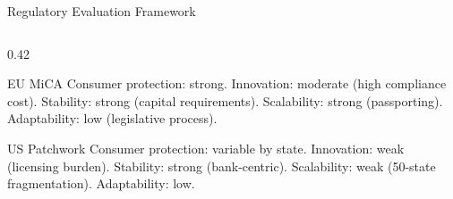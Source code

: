\begin{frame}{Regulatory Evaluation Framework}
\begin{columns}[T]
\begin{column}{0.42\textwidth}
      \vspace{0.3em}
      \begin{block}{EU MiCA}
        Consumer protection: strong. Innovation: moderate (high compliance
        cost). Stability: strong (capital requirements). Scalability:
        strong (passporting). Adaptability: low (legislative process).
      \end{block}

      \vspace{0.3em}
      \begin{block}{US Patchwork}
        Consumer protection: variable by state. Innovation: weak (licensing
        burden). Stability: strong (bank-centric). Scalability: weak
        (50-state fragmentation). Adaptability: low.
      \end{block}
    \end{column}
  \end{columns}
\end{frame}


